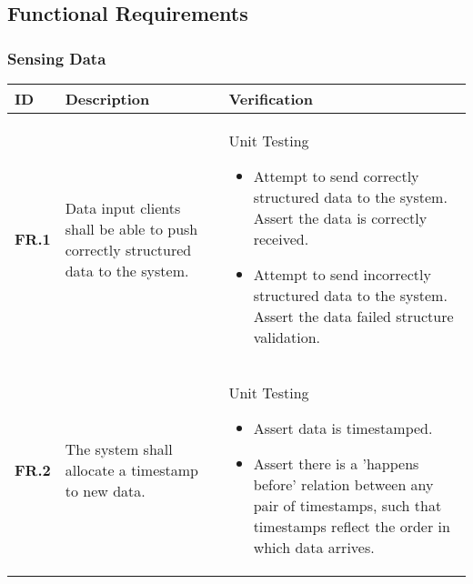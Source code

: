 \subsection{Functional Requirements}
\subsubsection{Sensing Data}
\begin{table}
    \begin{tabular}{|l|l|l}
    	\hline
    	\textbf{ID}   & \textbf{Description}                                                              & \textbf{Verification}                                                                                                                                                                                                                                              \\ \hline
    	\textbf{FR.1} & Data input clients shall be able to push correctly structured data to the system. & Unit Testing\begin{itemize}\item Attempt to send correctly structured data to the system. Assert the data is correctly received.\item Attempt to send incorrectly structured data to the system. Assert the data failed structure validation.\end{itemize} \\ \hline
    	\textbf{FR.2} & The system shall allocate a timestamp to new data.                                & Unit Testing\begin{itemize}\item Assert data is timestamped.\item Assert there is a ’happens before’ relation between any pair of timestamps, such that timestamps reflect the order in which data arrives.\end{itemize}                                   \\ \hline
	\end{tabular}
\end{table}
